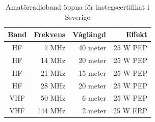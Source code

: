\begin{table}[H]
\centering
\begin{tabular}{crrr}
  \textbf{Band} & \textbf{Frekvens} & \textbf{Våglängd} & \textbf{Effekt} \\ \hline
   HF           & 7 MHz             & 40 meter          & 25 W PEP        \\
   HF           & 14 MHz            & 20 meter          & 25 W PEP        \\
   HF           & 21 MHz            & 15 meter          & 25 W PEP        \\
   HF           & 28 MHz            & 20 meter          & 25 W PEP        \\ \hline
   VHF          & 50 MHz            & 6 meter           & 25 W PEP        \\
   VHF          & 144 MHz           & 2 meter           & 25 W ERP
\end{tabular}
\caption{Amatörradioband öppna för instegscertifikat i Ssverige}
\end{table}
